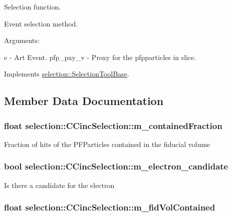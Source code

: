 Selection function. 

Event selection method.

Arguments\-:

e -\/ Art Event. pfp\-\_\-pxy\-\_\-v -\/ Proxy for the pfpparticles in slice. 

Implements \hyperlink{classselection_1_1SelectionToolBase_ab63818dac49b43418fe9eb3b8cd98c9c}{selection\-::\-Selection\-Tool\-Base}.



\subsection{Member Data Documentation}
\hypertarget{classselection_1_1CCincSelection_a5ac3c52c6a88691182c3b3c6594d9744}{
\subsubsection[{m\-\_\-contained\-Fraction}]{\setlength{\rightskip}{0pt plus 5cm}float selection\-::\-C\-Cinc\-Selection\-::m\-\_\-contained\-Fraction\hspace{0.3cm}{\ttfamily [private]}}}\label{classselection_1_1CCincSelection_a5ac3c52c6a88691182c3b3c6594d9744}
Fraction of hits of the P\-F\-Particles contained in the fiducial volume \hypertarget{classselection_1_1CCincSelection_a61b7a5e571eac85c8171a3dbd6ab57c6}{
\subsubsection[{m\-\_\-electron\-\_\-candidate}]{\setlength{\rightskip}{0pt plus 5cm}bool selection\-::\-C\-Cinc\-Selection\-::m\-\_\-electron\-\_\-candidate\hspace{0.3cm}{\ttfamily [private]}}}\label{classselection_1_1CCincSelection_a61b7a5e571eac85c8171a3dbd6ab57c6}
Is there a candidate for the electron \hypertarget{classselection_1_1CCincSelection_a3412d86b03a97a65fed3d5d8a41ed2c0}{
\subsubsection[{m\-\_\-fid\-Vol\-Contained}]{\setlength{\rightskip}{0pt plus 5cm}float selection\-::\-C\-Cinc\-Selection\-::m\-\_\-fid\-Vol\-Contained\hspace{0.3cm}{\ttfamily [private]}}}\label{classselection_1_1CCincSelection_a3412d86b03a97a65fed3d5d8a41ed2c0}
